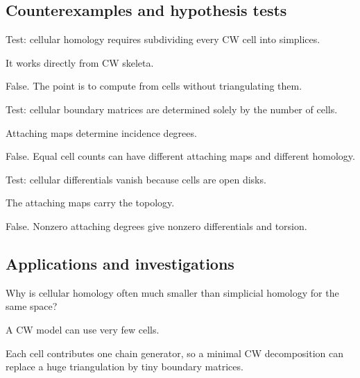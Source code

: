 \subsection*{Counterexamples and hypothesis tests}

\begin{exercise}\label{exr:viii18-ped-10}
Test: cellular homology requires subdividing every CW cell into simplices.
\end{exercise}
\begin{hint}
It works directly from CW skeleta.
\end{hint}
\begin{solution}
False. The point is to compute from cells without triangulating them.
\end{solution}

\begin{exercise}\label{exr:viii18-ped-11}
Test: cellular boundary matrices are determined solely by the number of cells.
\end{exercise}
\begin{hint}
Attaching maps determine incidence degrees.
\end{hint}
\begin{solution}
False. Equal cell counts can have different attaching maps and different homology.
\end{solution}

\begin{exercise}\label{exr:viii18-ped-12}
Test: cellular differentials vanish because cells are open disks.
\end{exercise}
\begin{hint}
The attaching maps carry the topology.
\end{hint}
\begin{solution}
False. Nonzero attaching degrees give nonzero differentials and torsion.
\end{solution}

\subsection*{Applications and investigations}

\begin{exercise}\label{exr:viii18-ped-13}
Why is cellular homology often much smaller than simplicial homology for the same space?
\end{exercise}
\begin{hint}
A CW model can use very few cells.
\end{hint}
\begin{solution}
Each cell contributes one chain generator, so a minimal CW decomposition can replace a huge triangulation by tiny boundary matrices.
\end{solution}

